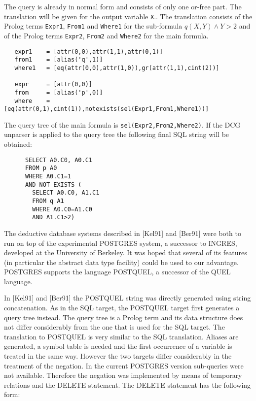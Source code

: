 The query is already in normal form and consists of only one or-free part. The translation
will be given for the output variable \verb.X... The translation consists of the Prolog terms 
\verb.Expr1., \verb.From1. and \verb.Where1. for the sub-formula $q(X,Y) \wedge Y>2$ and of 
the Prolog terms \verb.Expr2., \verb.From2. and \verb.Where2. for the main formula.

{\small
\begin{verbatim}
   expr1    = [attr(0,0),attr(1,1),attr(0,1)]
   from1    = [alias('q',1)]
   where1   = [eq(attr(0,0),attr(1,0)),gr(attr(1,1),cint(2))]

   expr     = [attr(0,0)]
   from     = [alias('p',0)]
   where    = [eq(attr(0,1),cint(1)),notexists(sel(Expr1,From1,Where1))]
\end{verbatim}
}

The query tree of the main formula is \verb.sel(Expr2,From2,Where2).. If the DCG
unparser is applied to the query tree the following final SQL string will be obtained:

\begin{verbatim}
      SELECT A0.C0, A0.C1
      FROM p A0
      WHERE A0.C1=1
      AND NOT EXISTS (
        SELECT A0.C0, A1.C1
        FROM q A1
        WHERE A0.C0=A1.C0
        AND A1.C1>2)
\end{verbatim}

\label{secpostgres}
The deductive database systems described in [Kel91] and [Ber91] were both to run on top of
the experimental POSTGRES system, a successor to INGRES, developed at the University of 
Berkeley. It was hoped that several of its features (in particular the abstract data type
facility) could be used to our advantage. POSTGRES supports the language POSTQUEL, a successor
of the QUEL language.

In [Kel91] and [Ber91] the POSTQUEL string was directly generated using string concatenation. 
As in the SQL target, the POSTQUEL target first generates a query tree instead. The query tree is 
a Prolog term and its data structure does not differ considerably from the one that is used for the 
SQL target. The translation to POSTQUEL is very similar to the SQL translation. Aliases are 
generated, a symbol table is needed and the first occurrence of a variable is treated in the 
same way. However the two targets differ considerably in the treatment of the negation. 
In the current POSTGRES version sub-queries were not available. Therefore the negation was
implemented by means of temporary relations and the DELETE statement. The DELETE statement 
has the following form:

